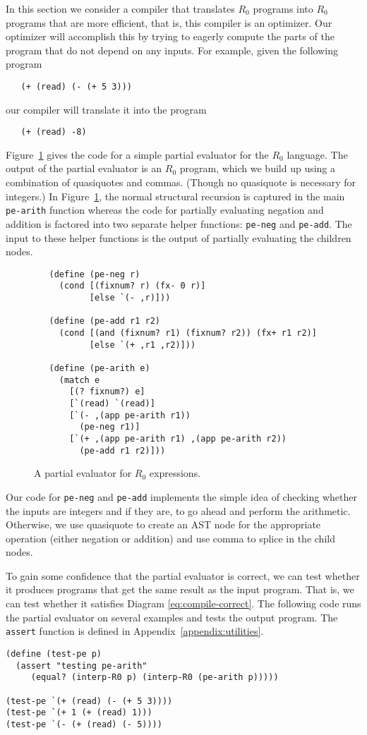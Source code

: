 \documentclass[11pt]{book}
\begin{document}
In this section we consider a compiler that translates $R_0$
programs into $R_0$ programs that are more efficient, that is,
this compiler is an optimizer. Our optimizer will accomplish this by
trying to eagerly compute the parts of the program that do not depend
on any inputs. For example, given the following program
\begin{lstlisting}
   (+ (read) (- (+ 5 3)))
\end{lstlisting}
our compiler will translate it into the program
\begin{lstlisting}
   (+ (read) -8)
\end{lstlisting}

Figure~\ref{fig:pe-arith} gives the code for a simple partial
evaluator for the $R_0$ language. The output of the partial evaluator
is an $R_0$ program, which we build up using a combination of
quasiquotes and commas. (Though no quasiquote is necessary for
integers.) In Figure~\ref{fig:pe-arith}, the normal structural
recursion is captured in the main \texttt{pe-arith} function whereas
the code for partially evaluating negation and addition is factored
into two separate helper functions: \texttt{pe-neg} and
\texttt{pe-add}. The input to these helper functions is the output of
partially evaluating the children nodes.

\begin{figure}[tbp]
\begin{lstlisting}
   (define (pe-neg r)
     (cond [(fixnum? r) (fx- 0 r)]
           [else `(- ,r)]))

   (define (pe-add r1 r2)
     (cond [(and (fixnum? r1) (fixnum? r2)) (fx+ r1 r2)]
           [else `(+ ,r1 ,r2)]))

   (define (pe-arith e)
     (match e
       [(? fixnum?) e]
       [`(read) `(read)]
       [`(- ,(app pe-arith r1))
         (pe-neg r1)]
       [`(+ ,(app pe-arith r1) ,(app pe-arith r2))
         (pe-add r1 r2)]))
\end{lstlisting}
\caption{A partial evaluator for $R_0$ expressions.}
\label{fig:pe-arith}
\end{figure}

Our code for \texttt{pe-neg} and \texttt{pe-add} implements the simple
idea of checking whether the inputs are integers and if they are, to
go ahead and perform the arithmetic.  Otherwise, we use quasiquote to
create an AST node for the appropriate operation (either negation or
addition) and use comma to splice in the child nodes.

To gain some confidence that the partial evaluator is correct, we can
test whether it produces programs that get the same result as the
input program. That is, we can test whether it satisfies Diagram
\eqref{eq:compile-correct}. The following code runs the partial
evaluator on several examples and tests the output program.  The
\texttt{assert} function is defined in Appendix~\ref{appendix:utilities}.
\begin{lstlisting}
(define (test-pe p)
  (assert "testing pe-arith"
     (equal? (interp-R0 p) (interp-R0 (pe-arith p)))))

(test-pe `(+ (read) (- (+ 5 3))))
(test-pe `(+ 1 (+ (read) 1)))
(test-pe `(- (+ (read) (- 5))))
\end{lstlisting}
\end{document}

